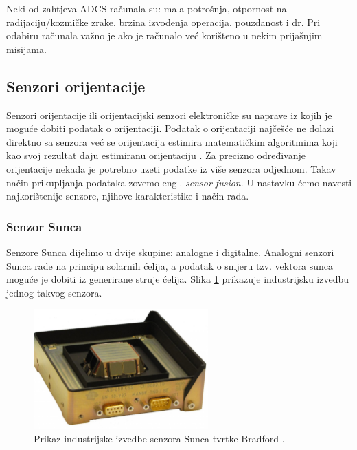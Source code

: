 \documentclass[times, utf8, diplomski, numeric]{templates/template}
\begin{document}
{{{            Neki od zahtjeva ADCS računala su: mala potrošnja, otpornost na radijaciju/kozmičke zrake, brzina izvođenja operacija, pouzdanost i dr. Pri odabiru računala važno je ako je računalo već korišteno u nekim prijašnjim misijama.
        }

        \subsection{Senzori orijentacije}{
        \label{subsection:senzori_orijentacije}
            Senzori orijentacije ili orijentacijski senzori elektroničke su naprave iz kojih je moguće dobiti podatak o orijentaciji. Podatak o orijentaciji najčešće ne dolazi direktno sa senzora već se orijentacija estimira matematičkim algoritmima koji kao svoj rezultat daju estimiranu orijentaciju \cite{adcsKnjiga}. Za precizno određivanje orijentacije nekada je potrebno uzeti podatke iz više senzora odjednom. Takav način prikupljanja podataka zovemo engl. \emph{sensor fusion}. U nastavku ćemo navesti najkorištenije senzore, njihove karakteristike i način rada.

            \subsubsection{Senzor Sunca}{
                Senzore Sunca dijelimo u dvije skupine: analogne i digitalne. Analogni senzori Sunca rade na principu solarnih ćelija, a podatak o smjeru tzv. vektora sunca moguće je dobiti iz generirane struje ćelija. Slika \ref{fig:sensor_sunca_industrija} prikazuje industrijsku izvedbu jednog takvog senzora.

                \begin{figure}[htb]
                \centering
                \includegraphics[width=0.6\textwidth]{images/sensor_sunca_industrija.jpg}
                \caption{Prikaz industrijske izvedbe senzora Sunca tvrtke Bradford \cite{sunSensorBradford}.}
                \label{fig:sensor_sunca_industrija}
                \end{figure}

}}}}
\end{document}
